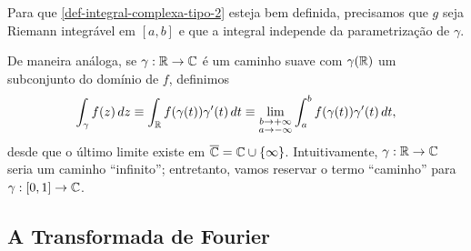         Para que \eqref{def-integral-complexa-tipo-2} esteja bem definida, precisamos que
        $g$ seja Riemann integrável em $[a,b]$ e que a integral independe da parametrização
        de $\gamma$.
        
        De maneira análoga, se $\gamma:\mathbb{R}\to\mathbb{C}$ é um caminho suave com $\gamma(\mathbb{R})$ um
        subconjunto do domínio de $f$, definimos
        \begin{align*}
            \int_{\gamma} f(z) \, dz \equiv \int_{\mathbb{R}} f(\gamma(t))\gamma'(t) \, dt
                                     \equiv \lim_{\substack{b\to +\infty \\ a\to -\infty}} 
                                     \int_a^b f(\gamma(t))\gamma'(t) \, dt,
        \end{align*}
        desde que o último limite existe em $\overline{\mathbb{C}} = \mathbb{C}\cup\{\infty\}$. Intuitivamente,
        $\gamma:\mathbb{R}\to\mathbb{C}$ seria um caminho ``infinito''; entretanto, vamos reservar o termo ``caminho''
        para $\gamma:[0,1]\to\mathbb{C}$.
        
    \subsection{A Transformada de Fourier}
